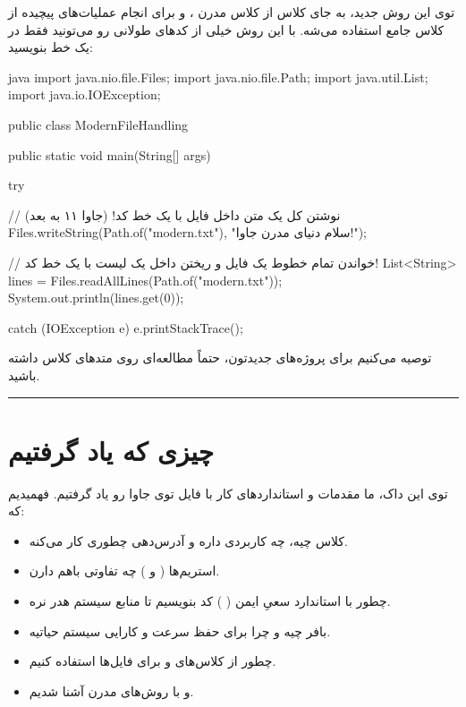 توی این روش جدید، به جای کلاس  از کلاس مدرن
، و برای انجام عملیات‌های پیچیده از کلاس جامع
 استفاده می‌شه. با این روش خیلی از کدهای طولانی رو
می‌تونید فقط در یک خط بنویسید:

\begin{codebox}{java}
import java.nio.file.Files;
import java.nio.file.Path;
import java.util.List;
import java.io.IOException;

public class ModernFileHandling {
    public static void main(String[] args) {
        try {
            // نوشتن کل یک متن داخل فایل با یک خط کد! (جاوا ۱۱ به بعد)
            Files.writeString(Path.of("modern.txt"), "سلام دنیای مدرن جاوا!");
            
            // خواندن تمام خطوط یک فایل و ریختن داخل یک لیست با یک خط کد!
            List<String> lines = Files.readAllLines(Path.of("modern.txt"));
            System.out.println(lines.get(0));
            
        } catch (IOException e) {
            e.printStackTrace();
        }
    }
}
\end{codebox}

توصیه می‌کنیم برای پروژه‌های جدیدتون، حتماً مطالعه‌ای روی متدهای کلاس
 داشته باشید.

\begin{center}\rule{0.5\linewidth}{0.5pt}\end{center}

\section{چیزی که یاد گرفتیم}

توی این داک، ما مقدمات و استانداردهای کار با فایل توی جاوا رو یاد
گرفتیم. فهمیدیم که:

\begin{itemize}
\tightlist
\item
  کلاس  چیه، چه کاربردی داره و آدرس‌دهی چطوری کار
  می‌کنه.
\item
  استریم‌ها (  و  ) چه تفاوتی
  باهم دارن.
\item
  چطور با استاندارد سعیِ ایمن (  ) کد بنویسیم تا
  منابع سیستم هدر نره.
\item
  بافر چیه و چرا برای حفظ سرعت و کارایی سیستم حیاتیه.
\item
  چطور از کلاس‌های  و  برای
  فایل‌ها استفاده کنیم.
\item
  و با روش‌های مدرن  آشنا شدیم.
\end{itemize}

